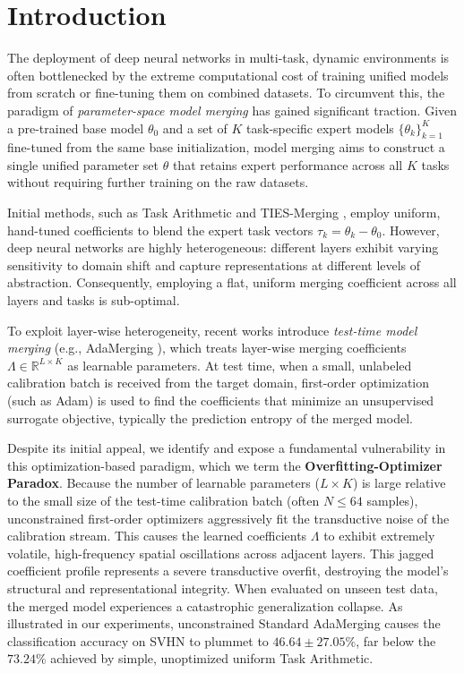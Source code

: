 \section{Introduction}
\label{sec:intro}

The deployment of deep neural networks in multi-task, dynamic environments is
often bottlenecked by the extreme computational cost of training unified models
from scratch or fine-tuning them on combined datasets. To circumvent this, the
paradigm of \emph{parameter-space model merging} has gained significant
traction. Given a pre-trained base model $\theta_0$ and a set of $K$
task-specific expert models $\{\theta_k\}_{k=1}^K$ fine-tuned from the same base
initialization, model merging aims to construct a single unified parameter set
$\theta$ that retains expert performance across all $K$ tasks without requiring
further training on the raw datasets.

Initial methods, such as Task Arithmetic \cite{ilharco2022editing} and
TIES-Merging \cite{yadav2023ties}, employ uniform, hand-tuned coefficients to
blend the expert task vectors $\tau_k = \theta_k - \theta_0$. However, deep
neural networks are highly heterogeneous: different layers exhibit varying
sensitivity to domain shift and capture representations at different levels of
abstraction. Consequently, employing a flat, uniform merging coefficient across
all layers and tasks is sub-optimal.

To exploit layer-wise heterogeneity, recent works introduce \emph{test-time
model merging} (e.g., AdaMerging \cite{yang2024adamerging}), which treats
layer-wise merging coefficients $\Lambda \in \mathbb{R}^{L \times K}$ as
learnable parameters. At test time, when a small, unlabeled calibration batch is
received from the target domain, first-order optimization (such as Adam) is used
to find the coefficients that minimize an unsupervised surrogate objective,
typically the prediction entropy of the merged model.

Despite its initial appeal, we identify and expose a fundamental vulnerability
in this optimization-based paradigm, which we term the
\textbf{Overfitting-Optimizer Paradox}. Because the number of learnable
parameters ($L \times K$) is large relative to the small size of the test-time
calibration batch (often $N \le 64$ samples), unconstrained first-order
optimizers aggressively fit the transductive noise of the calibration stream.
This causes the learned coefficients $\Lambda$ to exhibit extremely volatile,
high-frequency spatial oscillations across adjacent layers. This jagged
coefficient profile represents a severe transductive overfit, destroying the
model's structural and representational integrity. When evaluated on unseen test
data, the merged model experiences a catastrophic generalization collapse. As
illustrated in our experiments, unconstrained Standard AdaMerging causes the
classification accuracy on SVHN to plummet to $46.64 \pm 27.05\%$, far below the
$73.24\%$ achieved by simple, unoptimized uniform Task Arithmetic.

